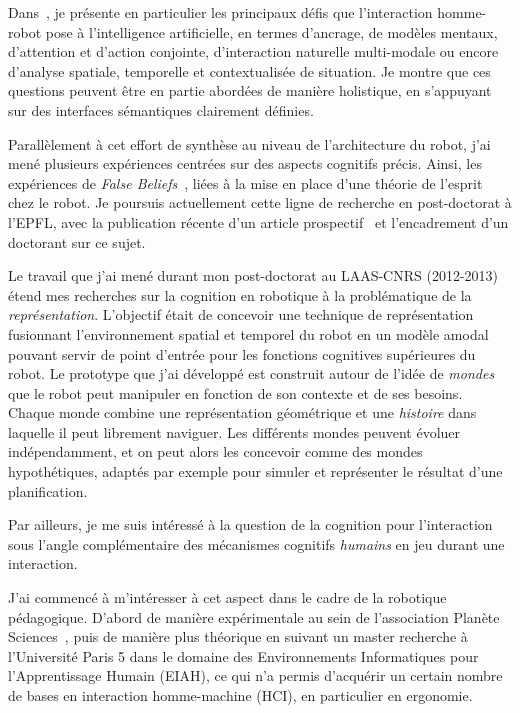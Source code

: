 \documentclass[a4paper]{article}
\begin{document}
Dans~\cite{lemaignan2015human}, je présente en particulier les
principaux défis que l'interaction homme-robot pose à l'intelligence
artificielle, en termes d'ancrage, de modèles mentaux, d'attention et
d'action conjointe, d'interaction naturelle multi-modale ou encore d'analyse
spatiale, temporelle et contextualisée de situation. Je montre que ces
questions peuvent être en partie abordées de manière holistique, en s'appuyant
sur des interfaces sémantiques clairement définies.

Parallèlement à cet effort de synthèse au niveau de l'architecture du robot,
j'ai mené plusieurs expériences centrées sur des aspects cognitifs précis.
Ainsi, les expériences de \emph{False Beliefs}~\cite{warnier2012when}, liées à
la mise en place d'une théorie de l'esprit chez le robot. Je poursuis
actuellement cette ligne de recherche en post-doctorat à l'EPFL, avec la
publication récente d'un article prospectif~\cite{lemaignan2015mutual} et
l'encadrement d'un doctorant sur ce sujet.

Le travail que j'ai mené durant mon post-doctorat au LAAS-CNRS (2012-2013) étend
mes recherches sur la cognition en robotique à la problématique de la
\emph{représentation}. L'objectif était de concevoir une technique de
représentation fusionnant l'environnement spatial et temporel du robot en un
modèle amodal pouvant servir de point d'entrée pour les fonctions cognitives
supérieures du robot. Le prototype que j'ai développé est construit autour de
l'idée de \emph{mondes} que le robot peut manipuler en fonction de son contexte
et de ses besoins.  Chaque monde combine une représentation géométrique et une
\emph{histoire} dans laquelle il peut librement naviguer. Les différents mondes
peuvent évoluer indépendamment, et on peut alors les concevoir comme des mondes
hypothétiques, adaptés par exemple pour simuler et représenter le résultat d'une
planification.

Par ailleurs, je me suis intéressé à la question de la cognition pour
l'interaction sous l'angle complémentaire des mécanismes cognitifs
\emph{humains} en jeu durant une interaction.

J'ai commencé à m'intéresser à cet aspect dans le cadre de la robotique
pédagogique. D'abord de manière expérimentale au sein de l'association Planète
Sciences~\cite{stinckwich2007squeakbot}, puis de manière plus théorique en
suivant un master recherche à l'Université Paris 5 dans le domaine des
Environnements Informatiques pour l'Apprentissage Humain (EIAH), ce qui n'a permis
d'acquérir un certain nombre de bases en interaction homme-machine (HCI), en
particulier en ergonomie.
\end{document}
